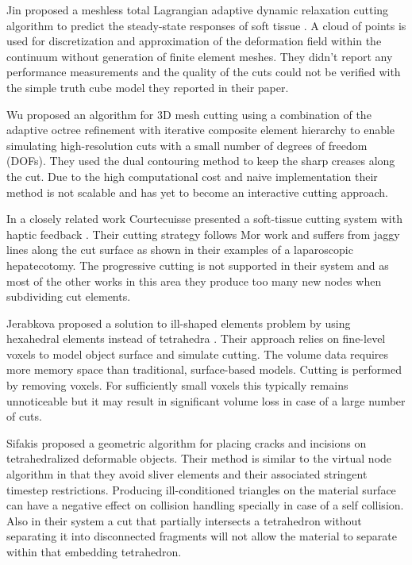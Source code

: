Jin \etal proposed a meshless total Lagrangian adaptive dynamic relaxation cutting algorithm to predict the steady-state 
responses of soft tissue \cite{Jin2013}. A cloud of points is used for discretization and approximation of the deformation 
field within the continuum without generation of finite element meshes. They didn't report 
any performance measurements and the quality of the cuts could not be verified with the simple truth cube model they reported in their paper.
 
Wu \etal \cite{Wu2011} proposed an algorithm for 3D mesh cutting using a combination of the adaptive octree refinement with iterative composite
element hierarchy to enable simulating high-resolution cuts with a small number of degrees of freedom (DOFs). 
They used the dual contouring method \cite{Ju2002} to keep the sharp creases along the cut. Due to the high computational cost and naive implementation 
their method is not scalable and has yet to become an interactive cutting approach.

In a closely related work Courtecuisse \etal presented a soft-tissue cutting system with haptic 
feedback \cite{Courtecuisse2010a}. Their cutting strategy follows Mor \etal  \cite{Mor2000} work and 
suffers from jaggy lines along the cut surface as shown in their examples of a laparoscopic hepatecotomy.
The progressive cutting is not supported in their system and as most of the other works in this area they produce too many
new nodes when subdividing cut elements.

Jerabkova \etal proposed a solution to ill-shaped elements problem by using hexahedral elements instead of 
tetrahedra \cite{Jerabkova2010}. Their approach relies on fine-level voxels to model object surface and simulate cutting. 
The volume data requires more memory space than traditional, surface-based models. Cutting is performed by
removing voxels. For sufficiently small voxels this typically remains unnoticeable but it may result in 
significant volume loss in case of a large number of cuts. 


Sifakis \etal \cite{Sifakis2007} proposed a geometric algorithm for placing cracks and incisions on 
tetrahedralized deformable objects. Their method is similar to the virtual node algorithm in that they avoid 
sliver elements and their associated stringent timestep restrictions. Producing ill-conditioned triangles on 
the material surface can have a negative effect on collision handling specially in case of a self collision.
Also in their system a cut that partially intersects a tetrahedron without separating it into disconnected 
fragments will not allow the material to separate within that embedding tetrahedron.

